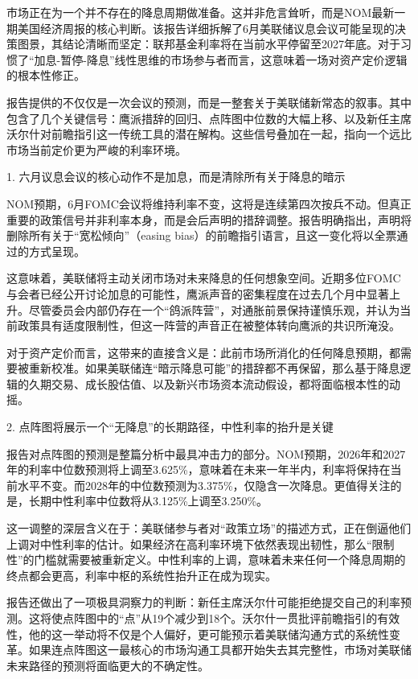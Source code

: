 \documentclass[11pt]{ctexart}
\begin{document}
市场正在为一个并不存在的降息周期做准备。这并非危言耸听，而是NOM最新一期美国经济周报的核心判断。该报告详细拆解了6月美联储议息会议可能呈现的决策图景，其结论清晰而坚定：联邦基金利率将在当前水平停留至2027年底。对于习惯了“加息-暂停-降息”线性思维的市场参与者而言，这意味着一场对资产定价逻辑的根本性修正。

报告提供的不仅仅是一次会议的预测，而是一整套关于美联储新常态的叙事。其中包含了几个关键信号：鹰派措辞的回归、点阵图中位数的大幅上移、以及新任主席沃尔什对前瞻指引这一传统工具的潜在解构。这些信号叠加在一起，指向一个远比市场当前定价更为严峻的利率环境。

1. 六月议息会议的核心动作不是加息，而是清除所有关于降息的暗示

NOM预期，6月FOMC会议将维持利率不变，这将是连续第四次按兵不动。但真正重要的政策信号并非利率本身，而是会后声明的措辞调整。报告明确指出，声明将删除所有关于“宽松倾向”（easing bias）的前瞻指引语言，且这一变化将以全票通过的方式呈现。

这意味着，美联储将主动关闭市场对未来降息的任何想象空间。近期多位FOMC与会者已经公开讨论加息的可能性，鹰派声音的密集程度在过去几个月中显著上升。尽管委员会内部仍存在一个“鸽派阵营”，对通胀前景保持谨慎乐观，并认为当前政策具有适度限制性，但这一阵营的声音正在被整体转向鹰派的共识所淹没。

对于资产定价而言，这带来的直接含义是：此前市场所消化的任何降息预期，都需要被重新校准。如果美联储连“暗示降息可能”的措辞都不再保留，那么基于降息逻辑的久期交易、成长股估值、以及新兴市场资本流动假设，都将面临根本性的动摇。

2. 点阵图将展示一个“无降息”的长期路径，中性利率的抬升是关键

报告对点阵图的预测是整篇分析中最具冲击力的部分。NOM预期，2026年和2027年的利率中位数预测将上调至3.625\%，意味着在未来一年半内，利率将保持在当前水平不变。而2028年的中位数预测为3.375\%，仅隐含一次降息。更值得关注的是，长期中性利率中位数将从3.125\%上调至3.250\%。

这一调整的深层含义在于：美联储参与者对“政策立场”的描述方式，正在倒逼他们上调对中性利率的估计。如果经济在高利率环境下依然表现出韧性，那么“限制性”的门槛就需要被重新定义。中性利率的上调，意味着未来任何一个降息周期的终点都会更高，利率中枢的系统性抬升正在成为现实。

报告还做出了一项极具洞察力的判断：新任主席沃尔什可能拒绝提交自己的利率预测。这将使点阵图中的“点”从19个减少到18个。沃尔什一贯批评前瞻指引的有效性，他的这一举动将不仅是个人偏好，更可能预示着美联储沟通方式的系统性变革。如果连点阵图这一最核心的市场沟通工具都开始失去其完整性，市场对美联储未来路径的预测将面临更大的不确定性。
\end{document}
